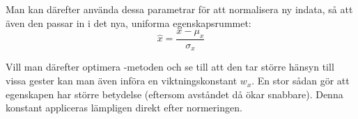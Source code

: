 \documentclass[../rapport_MVEX01-11-05]{subfiles}
\begin{document}
Man kan därefter använda dessa parametrar för att normalisera ny indata, så
att även den passar in i det nya, uniforma egenskapsrummet:
\begin{equation*}
	\hat{x} = \frac{x - \mu_x}{\sigma_x}
\end{equation*}

Vill man därefter optimera \knn-metoden och se till att den tar större hänsyn
till vissa gester kan man även införa en viktningskonstant $w_x$. En stor
sådan gör att egenskapen har större betydelse (eftersom avståndet då ökar
snabbare). Denna konstant appliceras lämpligen direkt efter normeringen.
\end{document}
